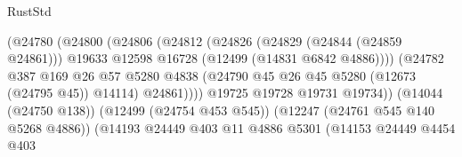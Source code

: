 \begin{lexlean}{RustStd}
\begin{coremodule}
{\begin{coremodule}
{{{{{{{{{{{{{{{{{{{{{{{{{{{{{{{{{{{{{{{{{{{{{{{{{{{{{{{{{{{{{{{{{{{{{{{{{{{{{{{{                                                (@24780
                                                  (@24800
                                                    (@24806
                                                      (@24812
                                                        (@24826
                                                          (@24829 (@24844 (@24859 @24861)))
                                                          @19633
                                                          @12598
                                                          @16728
                                                          (@12499 (@14831 @6842 @4886))))
                                                      (@24782
                                                        @387
                                                        @169
                                                        @26
                                                        @57
                                                        @5280
                                                        @4838
                                                        (@24790
                                                          @45
                                                          @26
                                                          @45
                                                          @5280
                                                          (@12673 (@24795 @45))
                                                          @14114)
                                                        @24861))))
                                                @19725
                                                @19728
                                                @19731
                                                @19734))
                                            (@14044 (@24750 @138))
                                            (@12499 (@24754 @453 @545))
                                            (@12247 (@24761 @545 @140 @5268 @4886))
                                            (@14193
                                              @24449
                                              @403
                                              @11
                                              @4886
                                              @5301
                                              (@14153
                                                @24449
                                                @4454
                                                @403
}}}}}}}}}}}}}}}}}}}}}}}}}}}}}}}}}}}}}}}}}}}}}}}}}}}}}}}}}}}}}}}}}}}}}}}}}}}}}}}}
\end{coremodule}}
\end{coremodule}
\end{lexlean}
